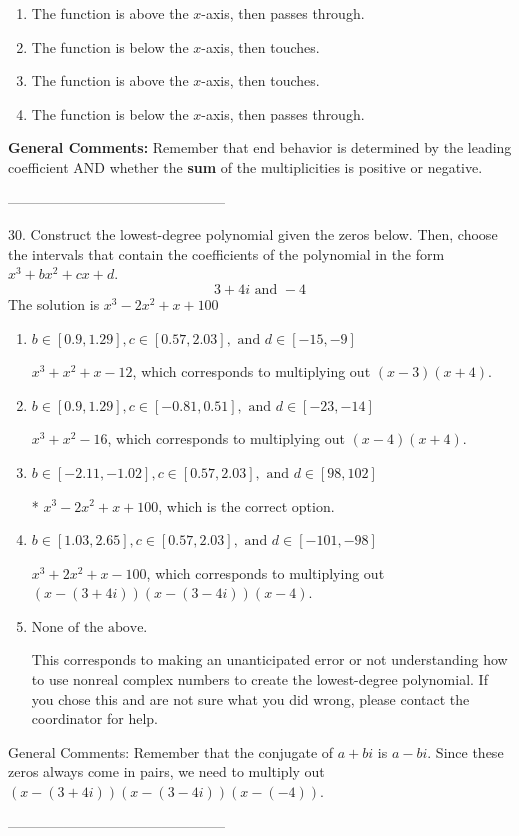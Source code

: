 \documentclass{extbook}[14pt]
\begin{document}
\begin{enumerate}[label=\Alph*.] 
\item The function is above the $x$-axis, then passes through.  
\item The function is below the $x$-axis, then touches.  
\item The function is above the $x$-axis, then touches.  
\item The function is below the $x$-axis, then passes through.  
\end{enumerate} 
 
\textbf{General Comments:} Remember that end behavior is determined by the leading coefficient AND whether the \textbf{sum} of the multiplicities is positive or negative.

-----------------------------------------------

30. Construct the lowest-degree polynomial given the zeros below. Then, choose the intervals that contain the coefficients of the polynomial in the form $x^3+bx^2+cx+d$.
\[ 3 + 4i \text{ and } -4 \] 
The solution is $ x^{3} -2 x^{2} +x + 100 $ 

\begin{enumerate}[label=\Alph*.] 
\item $ b \in [0.9, 1.29], c \in [0.57, 2.03], \text{ and } d \in [-15, -9] $ 

 $x^{3} + x^{2} +x -12$, which corresponds to multiplying out $(x -3)(x + 4)$. 
\item $ b \in [0.9, 1.29], c \in [-0.81, 0.51], \text{ and } d \in [-23, -14] $ 

 $x^{3} + x^{2} -16$, which corresponds to multiplying out $(x -4)(x + 4)$. 
\item $ b \in [-2.11, -1.02], c \in [0.57, 2.03], \text{ and } d \in [98, 102] $ 

 * $x^{3} -2 x^{2} +x + 100$, which is the correct option. 
\item $ b \in [1.03, 2.65], c \in [0.57, 2.03], \text{ and } d \in [-101, -98] $ 

 $x^{3} +2 x^{2} +x -100$, which corresponds to multiplying out $(x-(3 + 4i))(x-(3 - 4i))(x -4)$. 
\item $ \text{None of the above.} $ 

 This corresponds to making an unanticipated error or not understanding how to use nonreal complex numbers to create the lowest-degree polynomial. If you chose this and are not sure what you did wrong, please contact the coordinator for help. 
\end{enumerate} 
 
General Comments: Remember that the conjugate of $a+bi$ is $a-bi$. Since these zeros always come in pairs, we need to multiply out $(x-(3 + 4i))(x-(3 - 4i))(x-(-4))$.

-----------------------------------------------
\end{document}
